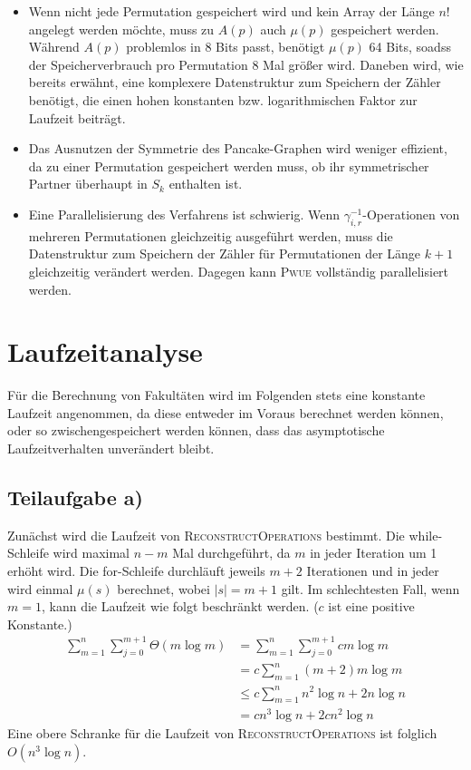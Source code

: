 \documentclass[a4paper, 10pt, ngerman]{article}
\begin{document}
\begin{itemize}
    \item Wenn nicht jede Permutation gespeichert wird und kein Array der Länge $n!$ angelegt werden möchte, muss zu $A(p)$ auch $\mu(p)$ gespeichert werden. Während $A(p)$ problemlos in 8 Bits passt, benötigt $\mu(p)$ 64 Bits, soadss der Speicherverbrauch pro Permutation 8 Mal größer wird. Daneben wird, wie bereits erwähnt, eine komplexere Datenstruktur zum Speichern der Zähler benötigt, die einen hohen konstanten bzw. logarithmischen Faktor zur Laufzeit beiträgt.
    \item Das Ausnutzen der Symmetrie des Pancake-Graphen wird weniger effizient, da zu einer Permutation gespeichert werden muss, ob ihr symmetrischer Partner überhaupt in $S_k$ enthalten ist.
    \item Eine Parallelisierung des Verfahrens ist schwierig. Wenn $\gamma_{i, r}^{-1}$-Operationen von mehreren Permutationen gleichzeitig ausgeführt werden, muss die Datenstruktur zum Speichern der Zähler für Permutationen der Länge $k + 1$ gleichzeitig verändert werden. Dagegen kann \textsc{Pwue} vollständig parallelisiert werden.
\end{itemize}

\section{Laufzeitanalyse}

Für die Berechnung von Fakultäten wird im Folgenden stets eine konstante Laufzeit angenommen, da diese entweder im Voraus berechnet werden können, oder so zwischengespeichert werden können, dass das asymptotische Laufzeitverhalten unverändert bleibt.

\subsection{Teilaufgabe a)}

Zunächst wird die Laufzeit von \textsc{ReconstructOperations} bestimmt. Die while-Schleife wird maximal $n - m$ Mal durchgeführt, da $m$ in jeder Iteration um 1 erhöht wird. Die for-Schleife durchläuft jeweils $m + 2$ Iterationen und in jeder wird einmal $\mu(s)$ berechnet, wobei $|s| = m+1$ gilt. Im schlechtesten Fall, wenn $m = 1$, kann die Laufzeit wie folgt beschränkt werden. ($c$ ist eine positive Konstante.)
\begin{align*}
    \sum_{m = 1}^n \sum_{j = 0}^{m+1} \Theta(m \log m)
     & = \sum_{m = 1}^n \sum_{j = 0}^{m+1} cm \log m \\
     & = c \sum_{m = 1}^n (m + 2)m \log m            \\
     & \le c \sum_{m = 1}^n n^2 \log n  + 2 n \log n \\
     & = cn^3 \log n + 2cn^2 \log n                 
\end{align*}
Eine obere Schranke für die Laufzeit von \textsc{ReconstructOperations} ist folglich $O(n^3 \log n)$.
\end{document}
